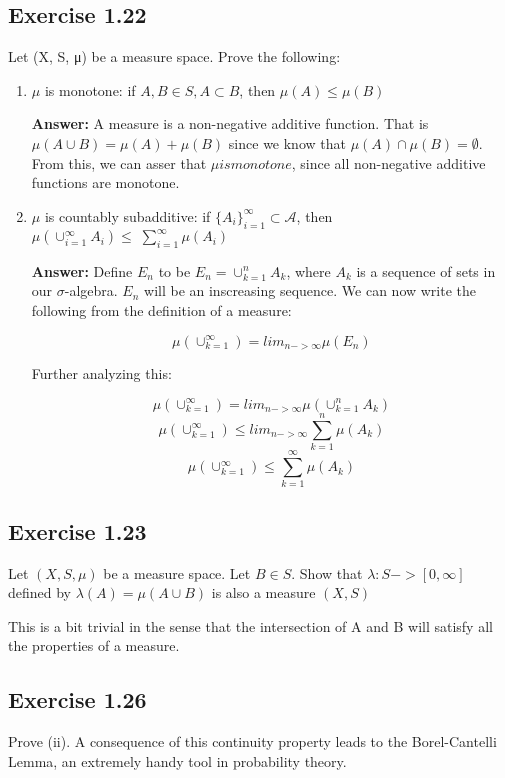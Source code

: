 \documentclass[a4paper]{article}
\begin{document}
\subsection*{Exercise 1.22}
Let (X, S, μ) be a measure space. Prove the following:
\begin{enumerate}
  \item $\mu$ is monotone: if $A,B\in S, A \subset B$, then $\mu(A) \leq \mu(B)$

  \textbf{Answer:} A measure is a non-negative additive function. That is $\mu(A \cup B) = \mu(A) + \mu(B)$ since we know that $\mu(A) \cap \mu (B) = \emptyset$. From this, we can asser that $\mu is monotone$, since all non-negative additive functions are monotone.

  \item $\mu$ is countably subadditive: if $\{A_i\}_{i=1}^{\infty} \subset \mathcal{A}$, then $\mu(\cup_{i=1}^{\infty} A_i) \leq 􏰒\sum_{i=1}^{\infty} \mu(A_i)$

  \textbf{Answer:} Define $E_n$ to be $E_n = \cup_{k=1}^{n}A_k$, where $A_k$ is a sequence of sets in our $\sigma$-algebra. $E_n$ will be an inscreasing sequence. We can now write the following from the definition of a measure:

  $$\mu(\cup_{k=1}^{\infty}) = lim_{n->\infty} \mu(E_n)$$

  Further analyzing this:

  $$\mu(\cup_{k=1}^{\infty}) = lim_{n->\infty} \mu(\cup_{k=1}^{n}A_k)$$
  $$\mu(\cup_{k=1}^{\infty}) \leq lim_{n->\infty} \sum_{k=1}^{n} \mu(A_k)$$
  $$\mu(\cup_{k=1}^{\infty}) \leq \sum_{k=1}^{\infty} \mu(A_k)$$

\end{enumerate}

\subsection*{Exercise 1.23} Let $(X, S, \mu)$ be a measure space. Let $B \in S$. Show that $\lambda : S -> [0,\infty]$ defined by $\lambda(A)=\mu(A\cup B)$ is also a measure $(X, S)$

This is a bit trivial in the sense that the intersection of A and B will satisfy all the properties of a measure.  %


\subsection*{Exercise 1.26} Prove (ii). A consequence of this continuity property leads to the Borel-Cantelli Lemma, an
extremely handy tool in probability theory.
\end{document}
